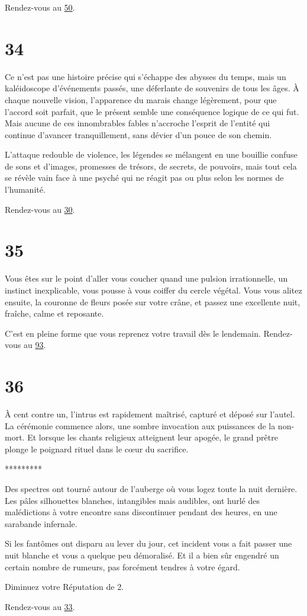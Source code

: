 \documentclass{report}
\newcommand{\gsection}[1]{
    \section{#1}
    \label{section-#1}
}
\newcommand{\glink}[1]{\hyperref[section-#1]{#1}}
\newcommand{\ellipse}{
    \begin{center}
        *********
    \end{center}
}
\begin{document}
Rendez-vous au \glink{50}.

\gsection{34}

Ce n'est pas une histoire précise qui s'échappe des abysses du temps, mais un kaléidoscope d'événements passés, une déferlante de souvenirs de tous les âges. À chaque nouvelle vision, l'apparence du marais change légèrement, pour que l'accord soit parfait, que le présent semble une conséquence logique de ce qui fut. Mais aucune de ces innombrables fables n'accroche l'esprit de l'entité qui continue d'avancer tranquillement, sans dévier d'un pouce de son chemin.

L'attaque redouble de violence, les légendes se mélangent en une bouillie confuse de sons et d'images, promesses de trésors, de secrets, de pouvoirs, mais tout cela se révèle vain face à une psyché qui ne réagit pas ou plus selon les normes de l'humanité.

Rendez-vous au \glink{30}.

\gsection{35}

Vous êtes sur le point d'aller vous coucher quand une pulsion irrationnelle, un instinct inexplicable, vous pousse à vous coiffer du cercle végétal. Vous vous alitez ensuite, la couronne de fleurs posée sur votre crâne, et passez une excellente nuit, fraîche, calme et reposante.

C'est en pleine forme que vous reprenez votre travail dès le lendemain. Rendez-vous au \glink{93}.

\gsection{36}

À cent contre un, l'intrus est rapidement maîtrisé, capturé et déposé sur l'autel. La cérémonie commence alors, une sombre invocation aux puissances de la non-mort. Et lorsque les chants religieux atteignent leur apogée, le grand prêtre plonge le poignard rituel dans le cœur du sacrifice.

\ellipse

Des spectres ont tourné autour de l'auberge où vous logez toute la nuit dernière. Les pâles silhouettes blanches, intangibles mais audibles, ont hurlé des malédictions à votre encontre sans discontinuer pendant des heures, en une sarabande infernale.

Si les fantômes ont disparu au lever du jour, cet incident vous a fait passer une nuit blanche et vous a quelque peu démoralisé. Et il a bien sûr engendré un certain nombre de rumeurs, pas forcément tendres à votre égard.

Diminuez votre Réputation de 2.

Rendez-vous au \glink{33}.
\end{document}
